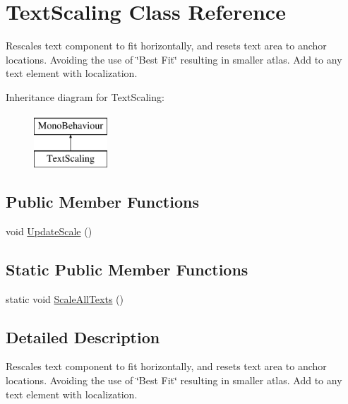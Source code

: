 \hypertarget{class_text_scaling}{}\section{Text\+Scaling Class Reference}
\label{class_text_scaling}


Rescales text component to fit horizontally, and resets text area to anchor locations. Avoiding the use of \char`\"{}\+Best Fit\char`\"{} resulting in smaller atlas. Add to any text element with localization.  


Inheritance diagram for Text\+Scaling\+:\begin{figure}[H]
\begin{center}
\leavevmode
\includegraphics[height=2.000000cm]{class_text_scaling}
\end{center}
\end{figure}
\subsection*{Public Member Functions}
\begin{DoxyCompactItemize}
\item 
void \hyperlink{class_text_scaling_a4865e3782dc23d6759fc77fe4190e852}{Update\+Scale} ()
\end{DoxyCompactItemize}
\subsection*{Static Public Member Functions}
\begin{DoxyCompactItemize}
\item 
static void \hyperlink{class_text_scaling_a54525f353fc9822caafafaa1b69e022a}{Scale\+All\+Texts} ()
\end{DoxyCompactItemize}


\subsection{Detailed Description}
Rescales text component to fit horizontally, and resets text area to anchor locations. Avoiding the use of \char`\"{}\+Best Fit\char`\"{} resulting in smaller atlas. Add to any text element with localization. 



